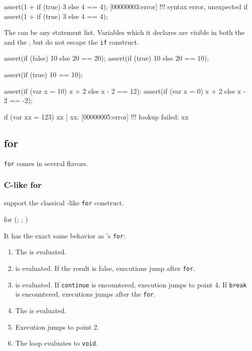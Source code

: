 \begin{urbiscript}[firstnumber=last]
assert(1 + if (true) 3 else 4 == 4);
[00000003:error] !!! syntax error, unexpected if
assert(1 + { if (true) 3 else 4 } == 4);
\end{urbiscript}

The  can be any statement list.  Variables which it
declares are visible in both the  and the
, but do not escape the \lstinline|if| construct.

\begin{urbiscript}[firstnumber=last]
assert({if (false) 10 else 20} == 20);
assert({if (true)  10 else 20} == 10);

assert({if (true) 10         } == 10);

assert({if (var x = 10) x + 2 else x - 2} == 12);
assert({if (var x = 0)  x + 2 else x - 2} == -2);

if (var xx = 123) xx | xx;
[00000005:error] !!! lookup failed: xx
\end{urbiscript}

\subsection{for}
\label{sec:lang:for}
\lstinline|for| comes in several flavors.

\subsubsection{C-like for}

\us support the classical \C-like \lstinline|for| construct.

\begin{urbiunchecked}[frame=, backgroundcolor=, ]
for (; ; )
\end{urbiunchecked}

It has the exact same behavior as \C's \lstinline|for|:

\begin{enumerate}
\item The  is evaluated.
\item {} is evaluated. If the result is false, executions
  jump after \lstinline|for|.
\item {} is evaluated. If \lstinline|continue| is encountered,
  execution jumps to point 4. If \lstinline|break| is encountered,
  executions jumps after the \lstinline|for|.
\item The  is evaluated.
\item Execution jumps to point 2.
\item The loop evaluates to \lstinline|void|.
\end{enumerate}

